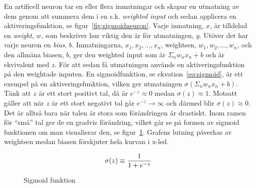 En artificell neuron tar en eller flera inmatningar och skapar en
utmatning av dem genom att summera dem i en s.k. \emph{weighted input} och
sedan applicera en aktiveringsfunktion, se figur~\ref{fig:sigmoidneuron}.
Varje inmatning, $x$, är tilldelad en \emph{weight}, $w$, som beskriver
hur viktig den är för utmatningen, $y$. Utöver det har varje neuron en \emph{bias},
$b$.
Inmatningarna, $x_1,x_2, \ldots, x_n$, weightsen, $w_1, w_2, \ldots, w_n$, och
den allmäna biasen, $b$, ger den weighted input som är $\Sigma_nw_nx_n + b$ och
är ekvivalent med $z$.
För att sedan få utmatningen används en aktiveringsfunktion på den weightade
inputen. En sigmoidfunktion, se ekvation~\ref{eq:sigmoid}, är ett exempel på en
aktiveringsfunktion, vilken ger utmatningen $\sigma(\Sigma_nw_nx_n + b)$.
Tänk att $z$ är ett stort positivt tal, då är $e^{-z} \approx 0 $ medan
$\sigma(z) \approx 1$.
Motsatt gäller att när $z$ är ett stort negativt tal går $e^{-z} \rightarrow
\infty $ och därmed blir $\sigma(z) \approx 0$. Det är alltså bara när talen är
stora som förändringen är drastiskt. Inom ramen för ``små'' tal ger de en
gradvis förändring, vilket går se på formen av sigmoid funktionen om man
visualierar den, se figur~\ref{fig:sigmoidfunction}. Grafens lutning påverkas av
weightsen medan biasen förskjuter hela kurvan i x-led.

\begin{equation} \label{eq:sigmoid}
	\sigma(z) \equiv \frac{1}{1 + e^{-z}} \\
\end{equation}

\begin{figure}
	\centering
	\caption{Sigmoid funktion}
	\label{fig:sigmoidfunction}
\end{figure}


